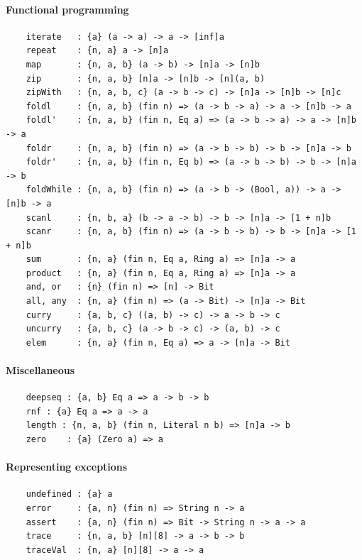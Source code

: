 \paragraph*{Functional programming}
\begin{Verbatim}
    iterate   : {a} (a -> a) -> a -> [inf]a
    repeat    : {n, a} a -> [n]a
    map       : {n, a, b} (a -> b) -> [n]a -> [n]b
    zip       : {n, a, b} [n]a -> [n]b -> [n](a, b)
    zipWith   : {n, a, b, c} (a -> b -> c) -> [n]a -> [n]b -> [n]c
    foldl     : {n, a, b} (fin n) => (a -> b -> a) -> a -> [n]b -> a
    foldl'    : {n, a, b} (fin n, Eq a) => (a -> b -> a) -> a -> [n]b -> a
    foldr     : {n, a, b} (fin n) => (a -> b -> b) -> b -> [n]a -> b
    foldr'    : {n, a, b} (fin n, Eq b) => (a -> b -> b) -> b -> [n]a -> b
    foldWhile : {n, a, b} (fin n) => (a -> b -> (Bool, a)) -> a -> [n]b -> a
    scanl     : {n, b, a} (b -> a -> b) -> b -> [n]a -> [1 + n]b
    scanr     : {n, a, b} (fin n) => (a -> b -> b) -> b -> [n]a -> [1 + n]b
    sum       : {n, a} (fin n, Eq a, Ring a) => [n]a -> a
    product   : {n, a} (fin n, Eq a, Ring a) => [n]a -> a
    and, or   : {n} (fin n) => [n] -> Bit
    all, any  : {n, a} (fin n) => (a -> Bit) -> [n]a -> Bit
    curry     : {a, b, c} ((a, b) -> c) -> a -> b -> c
    uncurry   : {a, b, c} (a -> b -> c) -> (a, b) -> c
    elem      : {n, a} (fin n, Eq a) => a -> [n]a -> Bit
\end{Verbatim}
\paragraph*{Miscellaneous}
\begin{Verbatim}
    deepseq : {a, b} Eq a => a -> b -> b
    rnf : {a} Eq a => a -> a
    length : {n, a, b} (fin n, Literal n b) => [n]a -> b
    zero    : {a} (Zero a) => a
\end{Verbatim}
\paragraph*{Representing exceptions}
\begin{Verbatim}
    undefined : {a} a
    error     : {a, n} (fin n) => String n -> a
    assert    : {a, n} (fin n) => Bit -> String n -> a -> a
    trace     : {n, a, b} [n][8] -> a -> b -> b
    traceVal  : {n, a} [n][8] -> a -> a
\end{Verbatim}

